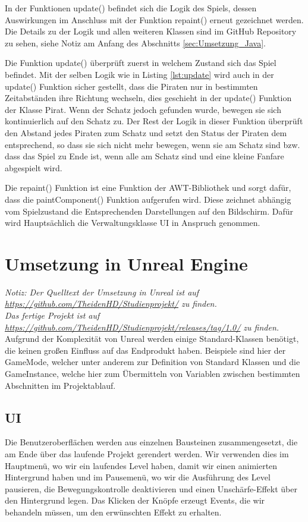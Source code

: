 \documentclass[
	12pt, %
	a4paper,
	listof=totoc, %
	bibliography=totoc, %
	numbers=noenddot, %
	ngerman, %
	headsepline, %
	oneside %
	]{scrbook} %
\begin{document}
In der Funktionen update() befindet sich die Logik des Spiels, dessen Auswirkungen im Anschluss mit der Funktion repaint() erneut gezeichnet werden.  
Die Details zu der Logik und allen weiteren Klassen sind im GitHub Repository zu sehen, siehe Notiz am Anfang des Abschnitts \ref{sec:Umsetzung_Java}.

Die Funktion update() überprüft zuerst in welchem Zustand sich das Spiel befindet. Mit der selben Logik wie in Listing \ref{lst:update} wird auch in der update() Funktion sicher gestellt, dass die Piraten nur in bestimmten Zeitabständen ihre Richtung wechseln, dies geschieht in der update() Funktion der Klasse Pirat.
Wenn der Schatz jedoch gefunden wurde, bewegen sie sich kontinuierlich auf den Schatz zu.
Der Rest der Logik in dieser Funktion überprüft den Abstand jedes Piraten zum Schatz und setzt den Status der Piraten dem entsprechend, so dass sie sich nicht mehr bewegen, wenn sie am Schatz sind bzw. dass das Spiel zu Ende ist, wenn alle am Schatz sind und eine kleine Fanfare abgespielt wird.
  
  
Die repaint() Funktion ist eine Funktion der AWT-Bibliothek und sorgt dafür, dass die paintComponent() Funktion aufgerufen wird. Diese zeichnet abhängig vom Spielzustand die Entsprechenden Darstellungen auf den Bildschirm. Dafür wird Hauptsächlich die Verwaltungsklasse UI in Anspruch genommen.



\section{Umsetzung in Unreal Engine}
\emph{Notiz: Der Quelltext der Umsetzung in Unreal ist auf \url{https://github.com/TheidenHD/Studienprojekt/} zu finden. \\
Das fertige Projekt ist auf \url{https://github.com/TheidenHD/Studienprojekt/releases/tag/1.0/} zu finden.}\\

Aufgrund der Komplexität von Unreal werden einige Standard-Klassen benötigt, die keinen großen Einfluss auf das Endprodukt haben. Beispiele sind hier der GameMode, welcher unter anderem zur Definition von Standard Klassen und die GameInstance, welche hier zum Übermitteln von Variablen zwischen bestimmten Abschnitten im Projektablauf.

\subsection{UI}
Die Benutzeroberflächen werden aus einzelnen Bausteinen zusammengesetzt, die am Ende über das laufende Projekt gerendert werden. Wir verwenden dies im Hauptmenü, wo wir ein laufendes Level haben, damit wir einen animierten Hintergrund haben und im Pausemenü, wo wir die Ausführung des Level pausieren, die Bewegungskontrolle deaktivieren und einen Unschärfe-Effekt über den Hintergrund legen. Das Klicken der Knöpfe erzeugt Events, die wir behandeln müssen, um den erwünschten Effekt zu erhalten.
\end{document}
